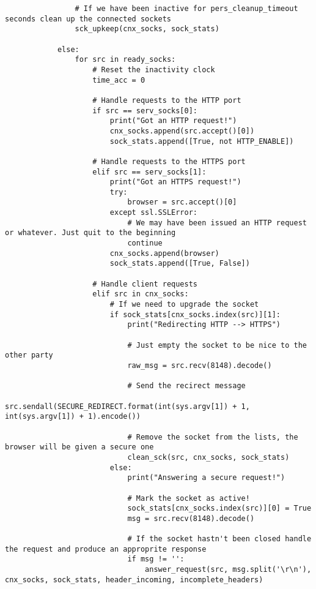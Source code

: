 \documentclass[landscape]{article}
\begin{document}
\begin{verbatim}
                # If we have been inactive for pers_cleanup_timeout seconds clean up the connected sockets
                sck_upkeep(cnx_socks, sock_stats)

            else:
                for src in ready_socks:
                    # Reset the inactivity clock
                    time_acc = 0

                    # Handle requests to the HTTP port
                    if src == serv_socks[0]:
                        print("Got an HTTP request!")
                        cnx_socks.append(src.accept()[0])
                        sock_stats.append([True, not HTTP_ENABLE])

                    # Handle requests to the HTTPS port
                    elif src == serv_socks[1]:
                        print("Got an HTTPS request!")
                        try:
                            browser = src.accept()[0]
                        except ssl.SSLError:
                            # We may have been issued an HTTP request or whatever. Just quit to the beginning
                            continue
                        cnx_socks.append(browser)
                        sock_stats.append([True, False])

                    # Handle client requests
                    elif src in cnx_socks:
                        # If we need to upgrade the socket
                        if sock_stats[cnx_socks.index(src)][1]:
                            print("Redirecting HTTP --> HTTPS")

                            # Just empty the socket to be nice to the other party
                            raw_msg = src.recv(8148).decode()

                            # Send the recirect message
                            src.sendall(SECURE_REDIRECT.format(int(sys.argv[1]) + 1, int(sys.argv[1]) + 1).encode())

                            # Remove the socket from the lists, the browser will be given a secure one
                            clean_sck(src, cnx_socks, sock_stats)
                        else:
                            print("Answering a secure request!")

                            # Mark the socket as active!
                            sock_stats[cnx_socks.index(src)][0] = True
                            msg = src.recv(8148).decode()

                            # If the socket hastn't been closed handle the request and produce an approprite response
                            if msg != '':
                                answer_request(src, msg.split('\r\n'), cnx_socks, sock_stats, header_incoming, incomplete_headers)


\end{verbatim}
\end{document}
